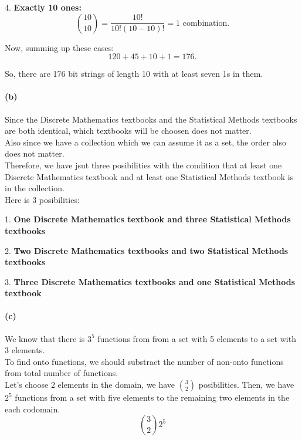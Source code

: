 \documentclass[12pt]{article}
\begin{document}
4. \textbf{Exactly 10 ones:}
   \[
   \binom{10}{10} = \frac{10!}{10!(10-10)!} = 1 \text{ combination.}
   \]

Now, summing up these cases:
\[
120 + 45 + 10 + 1 = 176.
\]

So, there are 176 bit strings of length 10 with at least seven 1s in them.


\paragraph{(b)}

   Since the Discrete Mathematics textbooks and the Statistical Methods textbooks are both identical, which textbooks will be choosen does not matter.\\

   Also since we have a collection which we can assume it as a set, the order also does not matter.\\

   Therefore, we have jsut three posibilities with the condition that at least one Discrete Mathematics textbook and at least one Statistical Methods textbook is in the collection.\\

   Here is 3 posibilities:

1. \textbf{One Discrete Mathematics textbook and three Statistical Methods textbooks}
   
2. \textbf{Two Discrete Mathematics textbooks and two Statistical Methods textbooks}

3. \textbf{Three Discrete Mathematics textbooks and one Statistical Methods textbook}

\paragraph{(c)}

We know that there is \(3^5\) functions from from a set with 5 elements to a set with 3 elements. \\

To find onto functions, we should substract the number of non-onto functions from total number of functions.\\

Let's choose 2 elements in the domain, we have \(\binom{3}{2}\) posibilities. Then, we have \(2^5\) functions from a set with five elements to the remaining two elements in the each codomain. \\
\[
\binom{3}{2}2^5
\]
\end{document}
